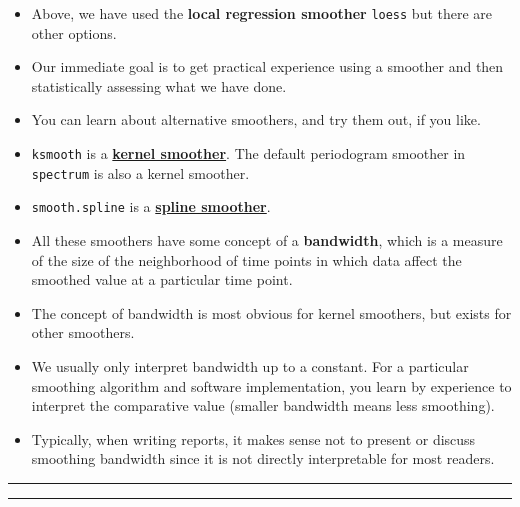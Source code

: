 \documentclass[]{article}
\begin{document}
\begin{itemize}
\item
  Above, we have used the \textbf{local regression smoother}
  \texttt{loess} but there are other options.
\item
  Our immediate goal is to get practical experience using a smoother and
  then statistically assessing what we have done.
\item
  You can learn about alternative smoothers, and try them out, if you
  like.
\item
  \texttt{ksmooth} is a
  \href{https://en.wikipedia.org/wiki/Kernel_smoother}{\textbf{kernel
  smoother}}. The default periodogram smoother in \texttt{spectrum} is
  also a kernel smoother.
\item
  \texttt{smooth.spline} is a
  \href{https://en.wikipedia.org/wiki/Smoothing_spline}{\textbf{spline
  smoother}}.
\item
  All these smoothers have some concept of a \textbf{bandwidth}, which
  is a measure of the size of the neighborhood of time points in which
  data affect the smoothed value at a particular time point.
\item
  The concept of bandwidth is most obvious for kernel smoothers, but
  exists for other smoothers.
\item
  We usually only interpret bandwidth up to a constant. For a particular
  smoothing algorithm and software implementation, you learn by
  experience to interpret the comparative value (smaller bandwidth means
  less smoothing).
\item
  Typically, when writing reports, it makes sense not to present or
  discuss smoothing bandwidth since it is not directly interpretable for
  most readers.
\end{itemize}

\begin{center}\rule{0.5\linewidth}{\linethickness}\end{center}

\begin{center}\rule{0.5\linewidth}{\linethickness}\end{center}
\end{document}
